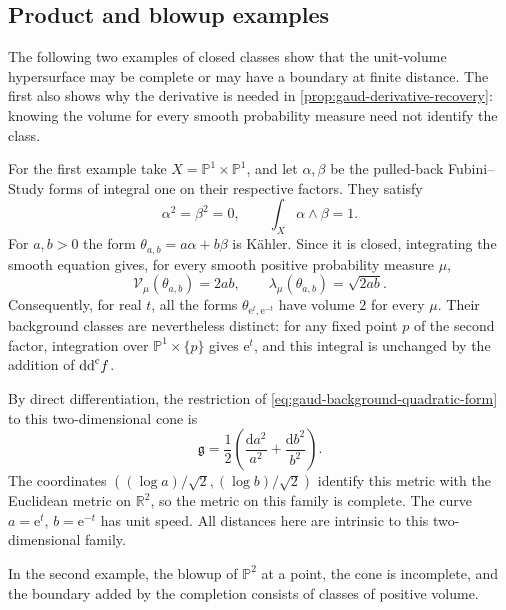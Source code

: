 \subsection{Product and blowup examples}
\label{sec:gaud-volume-profile-example}

The following two examples of closed classes show that the unit-volume hypersurface may be complete or may have a boundary at finite distance. The first also shows why the derivative is needed in \cref{prop:gaud-derivative-recovery}: knowing the volume for every smooth probability measure need not identify the class.

For the first example take $X=\mathbb P^1\times\mathbb P^1$, and let $\alpha,\beta$ be the pulled-back Fubini--Study forms of integral one on their respective factors. They satisfy
\[
 \alpha^2=\beta^2=0,\qquad\int_X\alpha\wedge\beta=1.
\]
For $a,b>0$ the form $\theta_{a,b}=a\alpha+b\beta$ is K\"ahler. Since it is closed, integrating the smooth equation gives, for every smooth positive probability measure $\mu$,
\[
 \mathcal V_\mu(\theta_{a,b})=2ab,
 \qquad \lambda_\mu(\theta_{a,b})=\sqrt{2ab}.
\]
Consequently, for real $t$, all the forms $\theta_{\mathrm{e}^t,\mathrm{e}^{-t}}$ have volume $2$ for every $\mu$. Their background classes are nevertheless distinct: for any fixed point $p$ of the second factor, integration over $\mathbb P^1\times\{p\}$ gives $\mathrm{e}^t$, and this integral is unchanged by the addition of $\mathrm{dd}^{\mathrm{c}} f$.

By direct differentiation, the restriction of \eqref{eq:gaud-background-quadratic-form} to this two-dimensional cone is
\[
 \mathfrak g=\frac12\left(\frac{\mathrm{d}a^2}{a^2}+\frac{\mathrm{d}b^2}{b^2}\right).
\]
The coordinates $((\log a)/\sqrt2,(\log b)/\sqrt2)$ identify this metric with the Euclidean metric on $\mathbb R^2$, so the metric on this family is complete. The curve $a=\mathrm{e}^t$, $b=\mathrm{e}^{-t}$ has unit speed. All distances here are intrinsic to this two-dimensional family.

In the second example, the blowup of $\mathbb P^2$ at a point, the cone is incomplete, and the boundary added by the completion consists of classes of positive volume.


